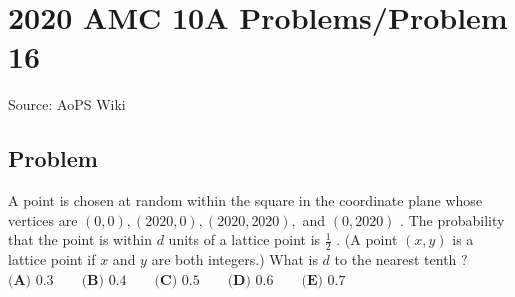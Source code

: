 \documentclass[12pt]{article}
\begin{document}
\section*{{2020 AMC 10A Problems/Problem 16}}
Source: AoPS Wiki

\subsection*{Problem}
A point is chosen at random within the square in the coordinate plane whose vertices are $(0, 0), (2020, 0), (2020, 2020),$ and $(0, 2020)$ . The probability that the point is within $d$ units of a lattice point is $\tfrac{1}{2}$ . (A point $(x, y)$ is a lattice point if $x$ and $y$ are both integers.) What is $d$ to the nearest tenth $?$ $\textbf{(A) } 0.3 \qquad \textbf{(B) } 0.4 \qquad \textbf{(C) } 0.5 \qquad \textbf{(D) } 0.6 \qquad \textbf{(E) } 0.7$
\end{document}
